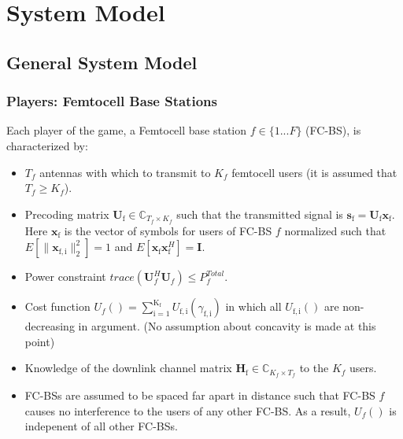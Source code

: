 \documentclass[12pt,a4paper]{report}
\begin{document}
\chapter{System Model}

\section{General System Model}\label{genmodel}

\subsection{Players: Femtocell Base Stations}


Each player of the game, a Femtocell base station $f \in \{1 ... F\}$ (FC-BS), is characterized by:
\begin{itemize}
\item 
$T_f$ antennas with which to transmit to $K_f$ femtocell users (it is assumed that $T_f \geq K_f$).
\\
\item 
	Precoding matrix $\mathbf{U}_{\mathrm{f}} \in \mathbb{C}_{T_f \times K_f}$ such that the transmitted 		
	signal is $\mathbf{s}_{\mathrm{f}
	}= \mathbf{U_{\mathrm{f}}}\mathbf{x_{\mathrm{f}}}$. Here $\mathbf{x_{\mathrm{f}}}$ is the 		
	vector of symbols for users of FC-BS $f$ normalized such that $E[\|\mathbf{x}_{\mathrm{f,i}}
	\|_2^2]=1$ and $E[\mathbf{x}_{\mathrm{f}}\mathbf{x}_{\mathrm{f}}^H]=\mathbf{I}$.
\\
\item 
	Power constraint $trace(\mathbf{U}_f^H\mathbf{U}_f) \leq P^{Total}_{f} $.

\item 
	Cost function $U_f() =
	\sum_{\mathrm{i=1}}^{\mathrm{K_f}}
    	 U_{\mathrm{f,i}}(\gamma_{\mathrm{f,i}}) $
    	in which all $U_{\mathrm{f,i}}()$ are non-decreasing in argument. (No assumption about concavity is made at this point)

\item 
	Knowledge of the downlink channel matrix $\mathbf{H_\mathrm{f}} \in \mathbb{C}_{K_f \times T_f} $ to the $K_f$ users.
\\
\item
	 FC-BSs are assumed to be spaced far apart in distance such that FC-BS $f$ 
	 causes no interference to the users of any other FC-BS. As a result, $U_f()$ is indepenent of all other FC-BSs.
\end{itemize}
\end{document}
